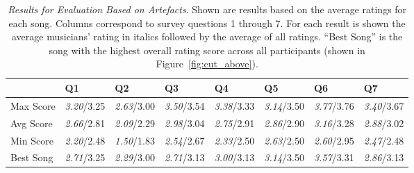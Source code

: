 \documentclass[phd,electronic,oneside,twosidetoc,letterpaper,chaptercenter,parttop,lol,lof,lot]{byumsphd}
\begin{document}
\begin{table}[]
\footnotesize
\centering
\begin{tabular}{@{}llllllll@{}}
                    & Q1 & Q2 & Q3 & Q4 & Q5 & Q6 & Q7 \\ \midrule
Max Score           & \textit{3.20}/3.25    & \textit{2.63}/3.00   & \textit{3.50}/3.54  & \textit{3.38}/3.33      & \textit{3.14}/3.50       & \textit{3.77}/3.76    & \textit{3.40}/3.67      \\
Avg Score           & \textit{2.66}/2.81    & \textit{2.09}/2.29   & \textit{2.98}/3.04  & \textit{2.75}/2.91      & \textit{2.86}/2.90      & \textit{3.16}/3.28    & \textit{2.88}/3.02      \\
Min Score           & \textit{2.20}/2.48    & \textit{1.50}/1.83   & \textit{2.54}/2.67  & \textit{2.33}/2.50      & \textit{2.63}/2.50       & \textit{2.60}/2.95    & \textit{2.47}/2.48      \\
Best Song & \textit{2.71}/3.25    & \textit{2.29}/3.00   & \textit{2.71}/3.13  & \textit{3.00}/3.13      & \textit{3.14}/3.50       & \textit{3.57}/3.31    & \textit{2.86}/3.13      \\
\end{tabular}
\caption{\label{tab:results}\textit{Results for Evaluation Based on Artefacts}. Shown are results based on the average ratings for each song. Columns correspond to survey questions 1 through 7. For each result is shown the average musicians' rating in italics followed by the average of all ratings. ``Best Song'' is the song with the highest overall rating score across all participants (shown in Figure~\ref{fig:cut_above}).}
\end{table}
\end{document}
